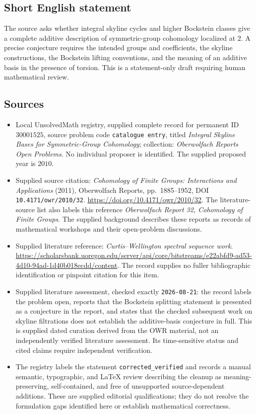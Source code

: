 \documentclass[11pt]{article}
\begin{document}
\subsection{Short English statement}
The source asks whether integral skyline cycles and higher Bockstein classes give a complete additive description of symmetric-group cohomology localized at \(2\). A precise conjecture requires the intended groups and coefficients, the skyline constructions, the Bockstein lifting conventions, and the meaning of an additive basis in the presence of torsion. This is a statement-only draft requiring human mathematical review.
\subsection{Sources}
\begin{itemize}
\item Local UnsolvedMath registry, supplied complete record for permanent ID \(30001525\), source problem code \texttt{catalogue entry}, titled \emph{Integral Skyline Bases for Symmetric-Group Cohomology}; collection: \emph{Oberwolfach Reports Open Problems}. No individual proposer is identified. The supplied proposed year is \(2010\).
\item Supplied source citation: \emph{Cohomology of Finite Groups: Interactions and Applications} (2011), Oberwolfach Reports, pp.\ 1885--1952, DOI \texttt{10.4171/owr/2010/32}. \url{https://doi.org/10.4171/owr/2010/32}. The literature-source list also labels this reference \emph{Oberwolfach Report 32, Cohomology of Finite Groups}. The supplied background describes these reports as records of mathematical workshops and their open-problem discussions.
\item Supplied literature reference: \emph{Curtis--Wellington spectral sequence work}. \url{https://scholarsbank.uoregon.edu/server/api/core/bitstreams/e22abfd9-ad53-4d10-94ad-1d40b018ecdd/content}. The record supplies no fuller bibliographic identification or pinpoint citation for this item.
\item Supplied literature assessment, checked exactly \texttt{2026-08-21}: the record labels the problem open, reports that the Bockstein splitting statement is presented as a conjecture in the report, and states that the checked subsequent work on skyline filtrations does not establish the additive-basis conjecture in full. This is supplied dated curation derived from the OWR material, not an independently verified literature assessment. Its time-sensitive status and cited claims require independent verification.
\item The registry labels the statement \texttt{corrected\_verified} and records a manual semantic, typographic, and LaTeX review describing the cleanup as meaning-preserving, self-contained, and free of unsupported source-dependent additions. These are supplied editorial qualifications; they do not resolve the formulation gaps identified here or establish mathematical correctness.
\end{itemize}
\end{document}
